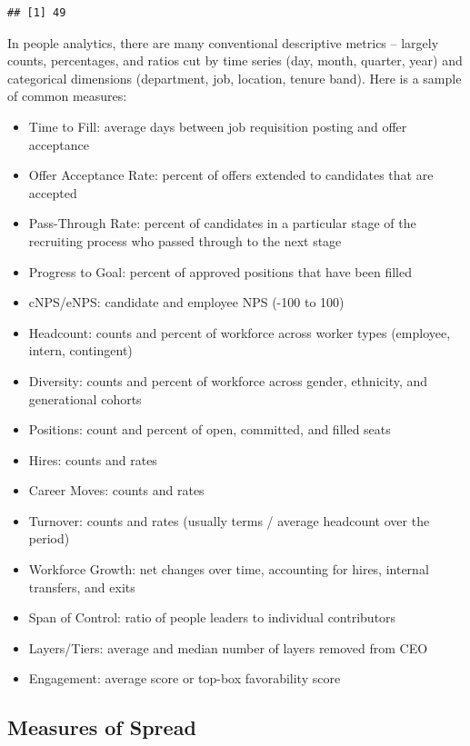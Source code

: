 \documentclass[]{book}
\providecommand{\tightlist}{%
  \setlength{\itemsep}{0pt}\setlength{\parskip}{0pt}}
\begin{document}
\begin{verbatim}
## [1] 49
\end{verbatim}

In people analytics, there are many conventional descriptive metrics -- largely counts, percentages, and ratios cut by time series (day, month, quarter, year) and categorical dimensions (department, job, location, tenure band). Here is a sample of common measures:

\begin{itemize}
\tightlist
\item
  Time to Fill: average days between job requisition posting and offer acceptance
\item
  Offer Acceptance Rate: percent of offers extended to candidates that are accepted
\item
  Pass-Through Rate: percent of candidates in a particular stage of the recruiting process who passed through to the next stage
\item
  Progress to Goal: percent of approved positions that have been filled
\item
  cNPS/eNPS: candidate and employee NPS (-100 to 100)
\item
  Headcount: counts and percent of workforce across worker types (employee, intern, contingent)
\item
  Diversity: counts and percent of workforce across gender, ethnicity, and generational cohorts
\item
  Positions: count and percent of open, committed, and filled seats
\item
  Hires: counts and rates
\item
  Career Moves: counts and rates
\item
  Turnover: counts and rates (usually terms / average headcount over the period)
\item
  Workforce Growth: net changes over time, accounting for hires, internal transfers, and exits
\item
  Span of Control: ratio of people leaders to individual contributors
\item
  Layers/Tiers: average and median number of layers removed from CEO
\item
  Engagement: average score or top-box favorability score
\end{itemize}

\hypertarget{measures-of-spread}{%
\subsection{Measures of Spread}\label{measures-of-spread}}
\end{document}
